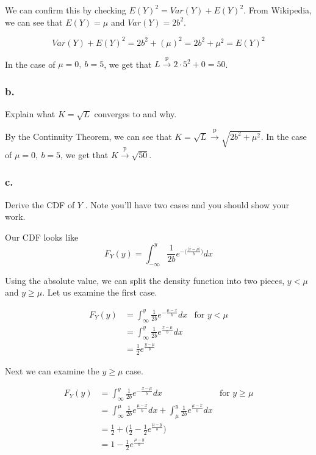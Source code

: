 \documentclass[12pt]{article}
\begin{document}
We can confirm this by checking $ E(Y)^2 = Var(Y) + E(Y)^2$. From Wikipedia, we can see that $E(Y) = \mu$ and $Var(Y) = 2b^2$.

$$Var(Y) + E(Y)^2 = 2b^2 + (\mu)^2 = 2b^2 + \mu^2 = E(Y)^2$$

In the case of $\mu =0, \ b = 5$, we get that $L \xrightarrow{\text{p}} 2\cdot 5^2 + 0 = 50$.

\subsubsection{b.}
Explain what $K = \sqrt{L}$ converges to and why.

\bigskip

By the Continuity Theorem, we can see that $K = \sqrt{L}  \xrightarrow{\text{p}}  \sqrt{2b^2 +\mu^2}$. In the case of $\mu =0, \ b = 5$, we get that $K \xrightarrow{\text{p}}  \sqrt{50}$.

\subsubsection{c.}
Derive the CDF of $Y$ . Note you’ll have two cases and you should show your work.

\bigskip
Our CDF looks like
$$F_Y(y) = \int_{-\infty}^{y}\frac{1}{2b}e^{-\Big(  \frac{|x-\mu |}{b}   \Big) }  dx$$

Using the absolute value, we can split the density function into two pieces, $y< \mu$ and $y\geq \mu$. Let us examine the first case.

\begin{align*}
F_Y(y) & = \int_{\infty}^{y} \frac{1}{2b}e^{-\frac{\mu-x}{b} } dx & \text{for } y <\mu\\
	& =  \int_{\infty}^{y} \frac{1}{2b}e^{\frac{x-\mu}{b} } dx \\
	& = \frac{1}{2} e^{\frac{y-\mu }{b}}
\end{align*}

Next we can examine the $y\geq \mu$ case.

\begin{align*}
F_Y(y) & = \int_{\infty}^{y} \frac{1}{2b}e^{-\frac{x - \mu}{b} } dx & \text{for } y \geq\mu\\
& =  \int_{\infty}^{\mu} \frac{1}{2b}e^{\frac{\mu - x}{b} } dx + \int_{\mu}^{y} \frac{1}{2b}e^{\frac{\mu - x}{b} } dx  \\
& = \frac{ 1}{ 2 } + \Big(\frac{ 1}{ 2 } - \frac{ 1 }{ 2 } e^{\frac{ \mu - y }{ b }}\Big) \\
& = 1 - \frac{ 1 }{ 2 } e^{\frac{ \mu - y }{ b }}
\end{align*}
\end{document}
